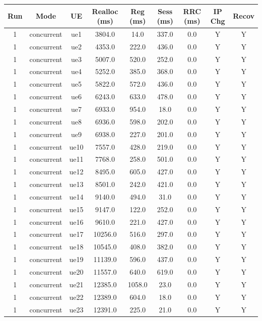 \begin{table}[ht]
\centering
\begin{tabular}{|c|c|c|c|c|c|c|c|c|}
\hline
Run & Mode & UE & Realloc (ms) & Reg (ms) & Sess (ms) & RRC (ms) & IP Chg & Recov \\
\hline
1 & concurrent & ue1 & 3804.0 & 14.0 & 337.0 & 0.0 & Y & Y \\
1 & concurrent & ue2 & 4353.0 & 222.0 & 436.0 & 0.0 & Y & Y \\
1 & concurrent & ue3 & 5007.0 & 520.0 & 252.0 & 0.0 & Y & Y \\
1 & concurrent & ue4 & 5252.0 & 385.0 & 368.0 & 0.0 & Y & Y \\
1 & concurrent & ue5 & 5822.0 & 572.0 & 436.0 & 0.0 & Y & Y \\
1 & concurrent & ue6 & 6243.0 & 633.0 & 478.0 & 0.0 & Y & Y \\
1 & concurrent & ue7 & 6933.0 & 954.0 & 18.0 & 0.0 & Y & Y \\
1 & concurrent & ue8 & 6936.0 & 598.0 & 202.0 & 0.0 & Y & Y \\
1 & concurrent & ue9 & 6938.0 & 227.0 & 201.0 & 0.0 & Y & Y \\
1 & concurrent & ue10 & 7557.0 & 428.0 & 219.0 & 0.0 & Y & Y \\
1 & concurrent & ue11 & 7768.0 & 258.0 & 501.0 & 0.0 & Y & Y \\
1 & concurrent & ue12 & 8495.0 & 605.0 & 427.0 & 0.0 & Y & Y \\
1 & concurrent & ue13 & 8501.0 & 242.0 & 421.0 & 0.0 & Y & Y \\
1 & concurrent & ue14 & 9140.0 & 494.0 & 31.0 & 0.0 & Y & Y \\
1 & concurrent & ue15 & 9147.0 & 122.0 & 252.0 & 0.0 & Y & Y \\
1 & concurrent & ue16 & 9610.0 & 221.0 & 427.0 & 0.0 & Y & Y \\
1 & concurrent & ue17 & 10256.0 & 516.0 & 297.0 & 0.0 & Y & Y \\
1 & concurrent & ue18 & 10545.0 & 408.0 & 382.0 & 0.0 & Y & Y \\
1 & concurrent & ue19 & 11139.0 & 596.0 & 437.0 & 0.0 & Y & Y \\
1 & concurrent & ue20 & 11557.0 & 640.0 & 619.0 & 0.0 & Y & Y \\
1 & concurrent & ue21 & 12385.0 & 1058.0 & 23.0 & 0.0 & Y & Y \\
1 & concurrent & ue22 & 12389.0 & 604.0 & 18.0 & 0.0 & Y & Y \\
1 & concurrent & ue23 & 12391.0 & 225.0 & 21.0 & 0.0 & Y & Y \\

\end{tabular}
\end{table}
